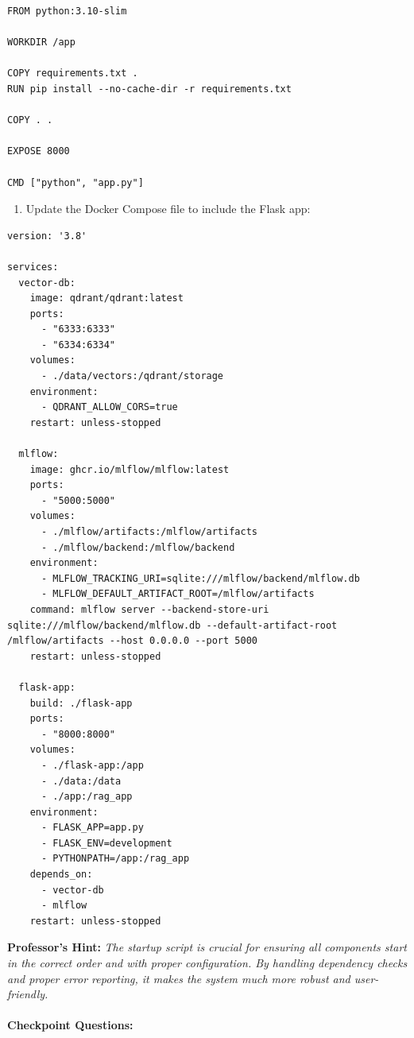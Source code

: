 \documentclass[
  screen,review,acmlarge]{acmart}
\providecommand{\tightlist}{%
  \setlength{\itemsep}{0pt}\setlength{\parskip}{0pt}}
\begin{document}
\begin{lstlisting}
FROM python:3.10-slim

WORKDIR /app

COPY requirements.txt .
RUN pip install --no-cache-dir -r requirements.txt

COPY . .

EXPOSE 8000

CMD ["python", "app.py"]
\end{lstlisting}

\begin{enumerate}
\def\labelenumi{\arabic{enumi}.}
\setcounter{enumi}{6}
\tightlist
\item
  Update the Docker Compose file to include the Flask app:
\end{enumerate}

\begin{lstlisting}
version: '3.8'

services:
  vector-db:
    image: qdrant/qdrant:latest
    ports:
      - "6333:6333"
      - "6334:6334"
    volumes:
      - ./data/vectors:/qdrant/storage
    environment:
      - QDRANT_ALLOW_CORS=true
    restart: unless-stopped

  mlflow:
    image: ghcr.io/mlflow/mlflow:latest
    ports:
      - "5000:5000"
    volumes:
      - ./mlflow/artifacts:/mlflow/artifacts
      - ./mlflow/backend:/mlflow/backend
    environment:
      - MLFLOW_TRACKING_URI=sqlite:///mlflow/backend/mlflow.db
      - MLFLOW_DEFAULT_ARTIFACT_ROOT=/mlflow/artifacts
    command: mlflow server --backend-store-uri sqlite:///mlflow/backend/mlflow.db --default-artifact-root /mlflow/artifacts --host 0.0.0.0 --port 5000
    restart: unless-stopped

  flask-app:
    build: ./flask-app
    ports:
      - "8000:8000"
    volumes:
      - ./flask-app:/app
      - ./data:/data
      - ./app:/rag_app
    environment:
      - FLASK_APP=app.py
      - FLASK_ENV=development
      - PYTHONPATH=/app:/rag_app
    depends_on:
      - vector-db
      - mlflow
    restart: unless-stopped
\end{lstlisting}

\textbf{Professor's Hint:} \emph{The startup script is crucial for ensuring all components start in the correct order and with proper configuration. By handling dependency checks and proper error reporting, it makes the system much more robust and user-friendly.}

\paragraph{Checkpoint Questions:}\label{checkpoint-questions-6}
\end{document}
